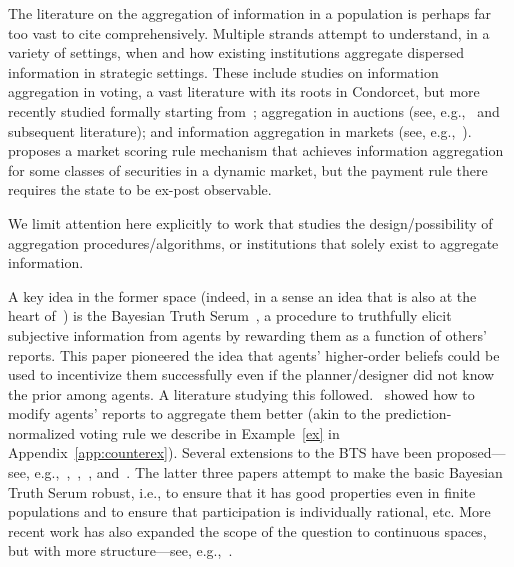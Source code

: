 \documentclass[12pt,reqno]{amsart}
\begin{document}
The literature on the aggregation of information in a population is perhaps far too vast to cite comprehensively. Multiple strands attempt to understand, in a variety of settings, when and how existing institutions aggregate dispersed information in strategic settings. These include studies on information aggregation in voting, a vast literature with its roots in Condorcet, but more recently studied formally starting from~\cite{feddersen1997voting}; aggregation in auctions (see, e.g.,~\cite{milgrom1982theory} and subsequent literature); and information aggregation in markets (see, e.g.,~\cite{grossman1980impossibility}).~\cite{ostrovsky2009information} proposes a market scoring rule mechanism that achieves information aggregation for some classes of securities in a dynamic market, but the payment rule there requires the state to be ex-post observable.

We limit attention here explicitly to work that studies the design/possibility of aggregation procedures/algorithms, or institutions that solely exist to aggregate information.

A key idea in the former space (indeed, in a sense an idea that is also at the heart of~\cite{prelec2017solution}) is the Bayesian Truth Serum~\citep{prelec2004bayesian}, a procedure to truthfully elicit subjective information from agents by rewarding them as a function of others' reports. This paper pioneered the idea that agents' higher-order beliefs could be used to incentivize them successfully even if the planner/designer did not know the prior among agents. A literature studying this followed.~\cite{prelec2006algorithm} showed how to modify agents' reports to aggregate them better (akin to the prediction-normalized voting rule we describe in Example~\ref{ex} in Appendix~\ref{app:counterex}). Several extensions to the BTS have been proposed---see, e.g.,~\cite{cvitanic2019honesty},~\cite{witkowski2012robust},~\cite{radanovic2013robust}, and~\cite{radanovic2014incentives}. The latter three papers attempt to make the basic Bayesian Truth Serum robust, i.e., to ensure that it has good properties even in finite populations and to ensure that participation is individually rational, etc. More recent work has also expanded the scope of the question to continuous spaces, but with more structure---see, e.g.,~\cite{kong2020information}.
\end{document}
